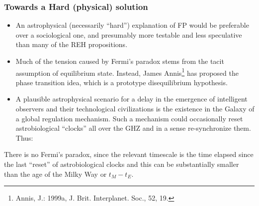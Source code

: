 %
%
%
%
%
%
\begin{frame}
\frametitle{Towards a Hard (physical) solution}

\begin{itemize}

\item 
An astrophysical (necessarily ``hard'') explanation of FP would be  preferable over a sociological one, and presumably more testable and less speculative than
many of the REH propositions.

\item  Much of the tension caused by Fermi’s paradox stems from the tacit
assumption of equilibrium state. Instead, James Annis\footnote{Annis, J.: 1999a, J. Brit. Interplanet. Soc., 52, 19.}  has proposed the phase transition
idea, which is a prototype disequilibrium hypothesis.

\item A plausible astrophysical scenario
for a delay in the emergence of intelligent observers and their technological civilizations
is the existence in the Galaxy of a global regulation
mechanism. Such a mechanism could occasionally reset astrobiological ``clocks'' all
over the GHZ and in a sense re-synchronize them. Thus:
\end{itemize}
 
\begin{block}{}

There is no Fermi's
paradox, since the relevant timescale is the
time elapsed since the last ``reset'' of astrobiological clocks and this can be substantially
smaller than the age of the Milky Way or
$t_M - t_E.$

\end{block}

\end{frame}

